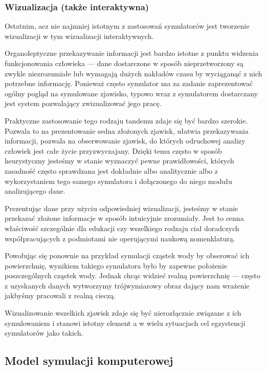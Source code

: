 \subsubsection{Wizualizacja (także interaktywna)}
\par{
Ostatnim, acz nie najmniej istotnym z zastosowań symulatorów jest tworzenie wizualizacji w tym wizualizacji interaktywnych.
}
\par{
Organoleptyczne przekazywanie informacji jest bardzo istotne z punktu widzenia funkcjonowania człowieka --- dane dostarczone w sposób nieprzetworzony są zwykle niezrozumiałe lub wymagają dużych nakładów czasu by wyciąganąć z nich potrzebne informację. Ponieważ często symulator ma za zadanie zaprezentować ogólny pogląd na symulowane zjawisko, typowo wraz z symulatorem dostarczany jest system pozwalający zwizualizować jego pracę.
}
\par{
Praktyczne zastosowanie tego rodzaju tandemu zdaje się być bardzo szerokie. Pozwala to na prezentowanie sedna złożonych zjawisk, ułatwia przekazywania informacji, pozwala na obserwowanie zjawisk, do których odruchowej analizy człowiek jest całe życie przyzwyczajany. Dzięki temu często w sposób heurystyczny jesteśmy w stanie wyznaczyć pewne prawidłowości, których zasadność często sprawdzana jest dokładnie albo analitycznie albo z wykorzystaniem tego samego symulatora i dołączonego do niego modułu analizującego dane.
}
\par{
Prezentując dane przy użyciu odpowiedniej wizualizacji, jesteśmy w stanie przekazać złożone informacje w sposób intuicyjnie zrozumiały. Jest to cenna właściwość szczególnie dla edukacji czy wszelkiego rodzaju ciał doradczych współpracujących z podmiotami nie operującymi naukową nomenklaturą.
}
\par{
Powołując się ponownie na przykład symulacji cząstek wody by obserować ich powierzchnię, wynikiem takiego symulatora było by zapewne położenie poszczególnych cząstek wody. Jednak chcąc widzieć realną powierzchnię --- często z uzyskanych danych wytworzymy trójwymiarowy obraz dający nam wrażenie jakbyśmy pracowali z realną cieczą.
}
\par{
Wizualizowanie wszelkich zjawisk zdaje się być nierozłącznie związane z ich symulowaniem i stanowi istotny element a w wielu sytuacjach cel egzystencji symulatorów jako takich.
}

\subsection{Model symulacji komputerowej}
